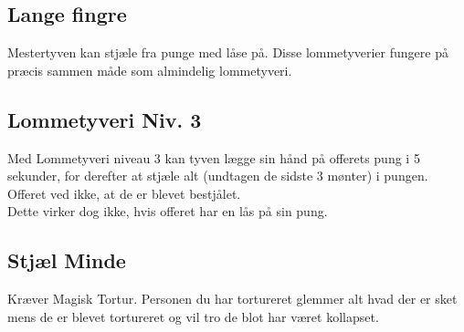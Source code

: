 \subsection{Lange fingre}
Mestertyven kan stjæle fra punge med låse på. Disse lommetyverier fungere på
præcis sammen måde som almindelig lommetyveri.\\

\subsection{Lommetyveri Niv. 3}
Med Lommetyveri niveau 3 kan tyven lægge sin hånd på offerets pung i 5 sekunder, for derefter at stjæle alt (undtagen de sidste 3 mønter) i pungen. Offeret ved ikke, at de er blevet bestjålet. \\
Dette virker dog ikke, hvis offeret har en lås på sin pung.\\

\subsection{Stjæl Minde}
Kræver Magisk Tortur. Personen du har tortureret glemmer alt hvad der er sket mens de er blevet tortureret og vil tro de blot har været kollapset.